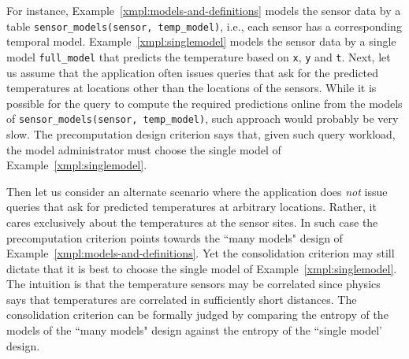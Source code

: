 \begin{example}
\label{xmpl:design-choices}
For instance, Example~\ref{xmpl:models-and-definitions} models the sensor data by a table \texttt{sensor\_models(sensor, temp\_model)}, i.e., each sensor has a corresponding temporal model. Example~\ref{xmpl:singlemodel} models the sensor data by a single model \texttt{full\_model} that predicts the temperature based on \texttt{x}, \texttt{y} and \texttt{t}. Next, let us assume that the application often issues queries that ask for the predicted temperatures at locations other than the locations of the sensors. While it is possible for the query to compute the required predictions online from the models of  \texttt{sensor\_models(sensor, temp\_model)}, such approach would probably be very slow. The precomputation design criterion says that, given such query workload, the model administrator must choose the single model of Example~\ref{xmpl:singlemodel}.

Then let us consider an alternate scenario where the application does {\em not} issue queries that ask for predicted temperatures at arbitrary locations. Rather, it cares exclusively about the temperatures at the sensor sites. In such case the precomputation criterion points towards the ``many models" design of Example~\ref{xmpl:models-and-definitions}. Yet the consolidation criterion may still dictate that it is best to choose the single model of Example~\ref{xmpl:singlemodel}. The intuition is that the temperature sensors may be correlated since physics says that temperatures are correlated in sufficiently short distances. The consolidation criterion can be formally judged by comparing the entropy of the models of the ``many models" design against the entropy of the ``single model' design.
\end{example}



